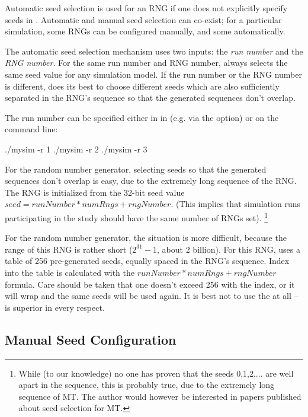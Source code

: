 Automatic seed selection is used for an RNG if one does not explicitly
specify seeds in . Automatic and manual seed selection can
co-exist; for a particular simulation, some RNGs can be configured
manually, and some automatically.

The automatic seed selection mechanism uses two inputs: the \textit{run number}
 and the \textit{RNG number}. For the same run number and RNG number,
{\opp} always selects the same seed value for any simulation model.
If the run number or the RNG number is different, {\opp} does its best
to choose different seeds which are also sufficiently separated in the RNG's sequence
so that the generated sequences don't overlap.

The run number can be specified either in in  (e.g. via the
 option) or on the command line:

\begin{commandline}
./mysim -r 1
./mysim -r 2
./mysim -r 3
\end{commandline}

For the  random number generator, selecting seeds
so that the generated sequences don't overlap is easy,
due to the extremely long sequence of the RNG.
The RNG is initialized from the 32-bit seed value $seed = runNumber*numRngs + rngNumber$.
(This implies that simulation runs participating in the study should have
the same number of RNGs set).
    \footnote{While (to our knowledge) no one has proven that the seeds 0,1,2,...
    are well apart in the sequence, this is probably true, due to the extremely
    long sequence of MT. The author would however be interested in papers
    published about seed selection for MT.}

For the  random number generator, the situation is more difficult,
because the range of this RNG is rather short ($2^{31}-1$, about 2 billion).
For this RNG, {\opp} uses a table of 256 pre-generated seeds, equally spaced
in the RNG's sequence. Index into the table is calculated with the
$runNumber*numRngs + rngNumber$ formula. Care should be taken that
one doesn't exceed 256 with the index, or it will wrap and the
same seeds will be used again. It is best not to use the 
at all --  is superior in every respect.


\subsection{Manual Seed Configuration}
\label{sec:config-sim:manual-seed-configuration}

